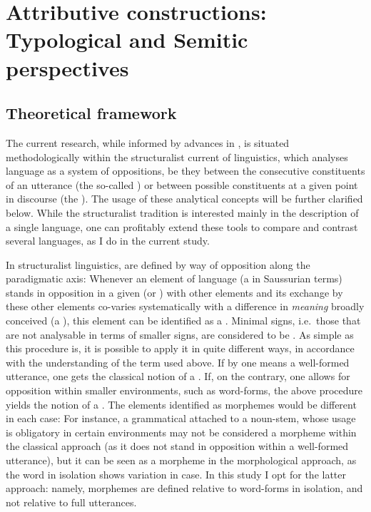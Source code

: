 \chapter{Attributive constructions: Typological and Semitic perspectives}
\label{ch:attributive}
\largerpage
\section{Theoretical framework} \label{ss:theoretical_framework}

The current research, while informed by advances in , is situated methodologically within the structuralist current of linguistics, which analyses language as a system of oppositions, be they between the consecutive constituents of  an utterance (the so-called ) or between possible constituents at a given point in discourse (the ). The usage of these analytical concepts will be further clarified below. While the structuralist tradition is interested mainly in the description of a single language, one can profitably extend these tools to compare and contrast several languages, as I do in the current study.

In structuralist linguistics,  are defined by way of opposition along the paradigmatic axis: Whenever an element of language (a  in Saussurian terms) stands in opposition in a given  (or ) with other elements and its exchange by these other elements co-varies systematically with a difference in \textit{meaning} broadly conceived (a ), this element can be identified as a . Minimal signs, i.e.\ those that are not analysable in terms of smaller signs, are considered to be . As simple as this procedure is, it is possible to apply it in quite different ways, in accordance with the understanding of the term  used above. If by  one means a well-formed utterance, one gets the classical notion of a . If, on the contrary, one allows for opposition within smaller environments, such as word-forms, the above procedure yields the notion of a . The elements identified as morphemes would be different in each case: For instance, a grammatical  attached to a noun-stem, whose usage is obligatory in certain environments may not be considered a morpheme within the classical approach (as it does not stand in opposition within a well-formed utterance), but it can be seen as a morpheme in the morphological approach, as the word in isolation shows variation in case. In this study I opt for the latter approach: namely, morphemes are defined relative to word-forms in isolation, and not relative to full utterances.  


